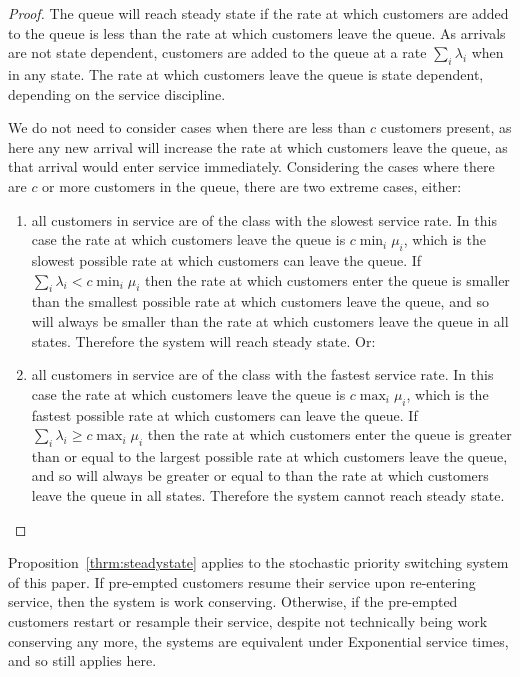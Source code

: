 \documentclass{article}
\begin{document}
\begin{proof}
The queue will reach steady state if the rate at which customers are added to
the queue is less than the rate at which customers leave the queue.
As arrivals are not state dependent, customers are added to the queue at a rate
$\sum_i \lambda_i$ when in any state.
The rate at which customers leave the queue is state dependent, depending on the
service discipline.

We do not need to consider cases when there are less than $c$ customers present,
as here any new arrival will increase the rate at which customers leave the
queue, as that arrival would enter service immediately.
Considering the cases where there are $c$ or more customers in the queue, there
are two extreme cases, either:

\begin{enumerate}
  \item all customers in service are of the class with the slowest service rate.
  In this case the rate at which customers leave the queue is $c \min_i \mu_i$,
  which is the slowest possible rate at which customers can leave the queue.
  If $\sum_i \lambda_i < c \min_i \mu_i$ then the rate at which customers enter
  the queue is smaller than the smallest possible rate at which customers leave
  the queue, and so will always be smaller than the rate at which customers
  leave the queue in all states. Therefore the system will reach steady state.
  Or:
  \item all customers in service are of the class with the fastest service rate.
  In this case the rate at which customers leave the queue is $c \max_i \mu_i$,
  which is the fastest possible rate at which customers can leave the queue.
  If $\sum_i \lambda_i \geq c \max_i \mu_i$ then the rate at which customers
  enter the queue is greater than or equal to the largest possible rate at which
  customers leave the queue, and so will always be greater or equal to than the
  rate at which customers leave the queue in all states. Therefore the system
  cannot reach steady state.
\end{enumerate}
\end{proof}

Proposition~\ref{thrm:steadystate} applies to the stochastic priority switching
system of this paper. If pre-empted customers resume their service upon
re-entering service, then the system is work conserving.
Otherwise, if the pre-empted customers restart or resample their service,
despite not technically being work conserving any more, the systems are
equivalent under Exponential service times, and so still applies here.
\end{document}
